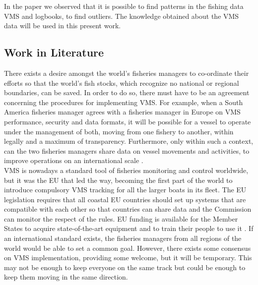In the paper we observed that it is possible to find patterns in the fishing data VMS and logbooks, to find outliers. 
The knowledge obtained about the VMS data will be used in this present work. 




\subsection{Work in Literature} %
\label{sub:literature_state}
There exists a desire amongst the world's fisheries managers to co-ordinate their efforts so that the world's fish stocks, which recognize no national or regional boundaries, can be saved.
In order to do so, there must have to be an agreement concerning the procedures for implementing VMS. For example, when a South America fisheries manager agrees with a fisheries manager in Europe on VMS performance, security and data formats, it will be possible for a vessel to operate under the management of both, moving from one fishery to another, within legally and a maximum of transparency. Furthermore, only within such a context, can the two fisheries managers share data on vessel movements and activities, to improve operations on an international scale \cite{FAOFishingOperations}.\\
VMS is nowadays a standard tool of fisheries monitoring and control worldwide, but it was the EU that led the way, becoming the first part of the world to introduce compulsory VMS tracking for all the larger boats in its fleet. The EU legislation requires that all coastal EU countries should set up systems that are compatible with each other so that countries can share data and the Commission can monitor the respect of the rules. EU funding is available for the Member States to acquire state-of-the-art equipment and to train their people to use it \cite{WEBSITE:EuropeanCommissionVMS}.
If an international standard exists, the fisheries managers from all regions of the world would be able to set a common goal. However, there exists some consensus on VMS implementation, providing some welcome, but it will be temporary. This may not be enough to keep everyone on the same track but could be enough to keep them moving in the same direction.\\

